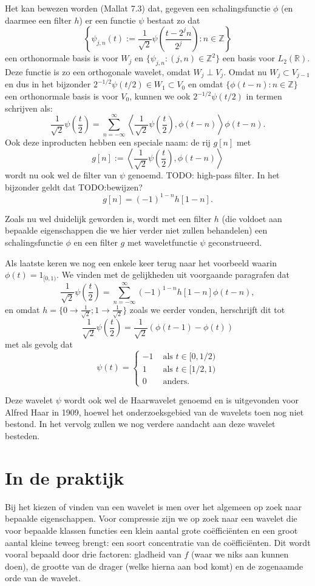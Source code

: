 \documentclass[11pt]{amsart}
\newcommand{\R}{\mathbb{R}}
\newcommand{\Z}{\mathbb{Z}}
\begin{document}
Het kan bewezen worden (Mallat 7.3) dat, gegeven een schalingsfunctie $\phi$ (en daarmee een filter $h$) er een functie $\psi$ bestaat zo dat 
\[
	\left\{ \psi_{j,n}(t) := \frac{1}{\sqrt{2}} \psi\left(\frac{t-2^jn}{2^j}\right) : n \in \Z \right\}
\] een orthonormale basis is voor $W_j$ en $\{ \psi_{j,n}: (j,n) \in \Z^2 \}$ een basis voor $L_2(\R)$. Deze functie is zo een orthogonale wavelet, omdat $W_j \perp V_j$.
Omdat nu $W_j \subset V_{j-1}$ en dus in het bijzonder $2^{-1/2} \psi(t/2) \in W_1 \subset V_0$ en omdat $\{ \phi(t-n): n \in \Z \}$ een orthonormale basis is voor $V_0$, kunnen we ook $2^{-1/2}\psi(t/2)$ in termen schrijven als:
\[
	\frac{1}{\sqrt{2}} \psi\left(\frac{t}{2}\right) = \sum_{n=-\infty}^{\infty} \left\langle \frac{1}{\sqrt{2}} \psi\left(\frac{t}{2}\right), \phi(t-n) \right\rangle \phi(t-n).
\]
Ook deze inproducten hebben een speciale naam: de rij $g[n]$ met
\[
	g[n] := \left\langle \frac{1}{\sqrt{2}} \psi\left(\frac{t}{2}\right), \phi(t-n) \right\rangle
\]
wordt nu ook wel de filter van $\psi$ genoemd. TODO: high-pass filter. In het bijzonder geldt dat TODO:bewijzen?
\[
	g[n] = (-1)^{1-n}h[1-n].
\]

Zoals nu wel duidelijk geworden is, wordt met een filter $h$ (die voldoet aan bepaalde eigenschappen die we hier verder niet zullen behandelen) een schalingsfunctie $\phi$ en een filter $g$ met waveletfunctie $\psi$ geconstrueerd.

Als laatste keren we nog een enkele keer terug naar het voorbeeld waarin $\phi(t) = 1_{[0,1)}$. We vinden met de gelijkheden uit voorgaande paragrafen dat
\[
\frac{1}{\sqrt{2}} \psi\left(\frac{t}{2}\right) = \sum_{n=-\infty}^{\infty} (-1)^{1-n}h[1-n] \phi(t-n),
\]
en omdat $h = \{ 0 \to \frac{1}{\sqrt{2}}; 1 \to \frac{1}{\sqrt{2}} \}$ zoals we eerder vonden, herschrijft dit tot
\[
\frac{1}{\sqrt{2}} \psi\left(\frac{t}{2}\right) = \frac{1}{\sqrt{2}}\left(\phi(t-1) - \phi(t)\right)
\]
met als gevolg dat
\[
	\psi(t) = \begin{cases} -1 & \text{ als } t \in [0,1/2) \\ 1 & \text{ als } t \in [1/2,1) \\ 0 & \text{ anders.} \end{cases}
\]

Deze wavelet $\psi$ wordt ook wel de Haarwavelet genoemd en is uitgevonden voor Alfred Haar in 1909, hoewel het onderzoeksgebied van de wavelets toen nog niet bestond. In het vervolg zullen we nog verdere aandacht aan deze wavelet besteden.

\section{In de praktijk}
Bij het kiezen of vinden van een wavelet is men over het algemeen op zoek naar bepaalde eigenschappen. Voor compressie zijn we op zoek naar een wavelet die voor bepaalde klassen functies een klein aantal grote co\"effici\"enten en een groot aantal kleine teweeg brengt: een soort concentratie van de co\"effici\"enten. Dit wordt vooral bepaald door drie factoren: gladheid van $f$ (waar we niks aan kunnen doen), de grootte van de drager (welke hierna aan bod komt) en de zogenaamde orde van de wavelet.
\end{document}
